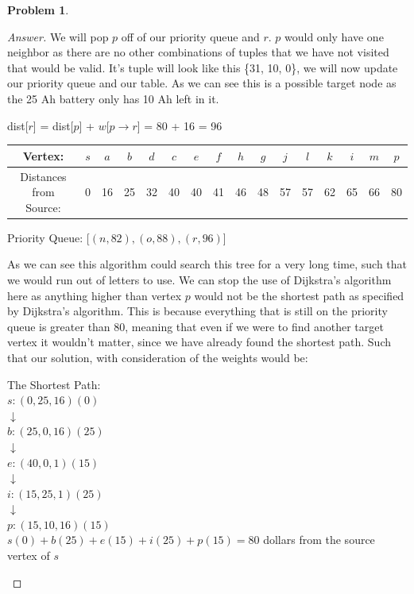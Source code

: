 \documentclass[11pt]{article}
\theoremstyle{definition}
\theoremstyle{definition}
\newtheorem{required}{Problem}
\theoremstyle{definition}
\begin{document}
\begin{required}
\begin{enumerate}[label=(\alph*)]
\begin{proof}[Answer]
We will pop $p$ off of our priority queue and $r$. $p$ would only have one neighbor as there are no other combinations of tuples that we have not visited that would be valid. It's tuple will look like this \{31, 10, 0\}, we will now update our priority queue and our table. As we can see this is a possible target node as the 25 Ah battery only has 10 Ah left in it.
\begin{center}
dist[$r$] = dist[$p$]  + $w$[$p \rightarrow r$] = 80 + 16 = 96 \\
\begin{tabular}{ | c | c | c | c | c | c | c | c | c | c | c | c | c | c | c | c |}
 \hline
 Vertex:& $s$ & $a$ & $b$ & $d$ & $c$ & $e$ & $f$ & $h$ & $g$ & $j$ & $l$ & $k$ & $i$ & $m$ & $p$\\ 
 \hline
 Distances from Source:& 0 & 16 & 25 & 32 & 40 & 40 & 41 & 46 & 48 & 57 & 57 & 62 & 65 & 66 & 80\\  
 \hline
\end{tabular}
\end{center}
\begin{center}
Priority Queue: [$(n, 82), (o, 88), (r, 96)$]
\end{center}

As we can see this algorithm could search this tree for a very long time, such that we would run out of letters to use. We can stop the use of Dijkstra's algorithm here as anything higher than vertex $p$ would not be the shortest path as specified by Dijkstra's algorithm. This is because everything that is still on the priority queue is greater than 80, meaning that even if we were to find another target vertex it wouldn't matter, since we have already found the shortest path. Such that our solution, with consideration of the weights would be: \\
\begin{center}
The Shortest Path:\\
$s:(0, 25, 16)(0)$ \\
$\downarrow$\\
$b:(25, 0, 16)(25)$ \\
$\downarrow$\\
$e:(40, 0, 1)(15)$ \\
$\downarrow$\\
$i:(15, 25, 1)(25)$ \\
$\downarrow$\\
$p:(15, 10, 16)(15)$ \\

$s(0) + b(25) + e(15) + i(25) + p(15) = 80$ dollars from the source vertex of $s$


\end{center}
\end{proof}
\end{enumerate}
\end{required}
\end{document}
